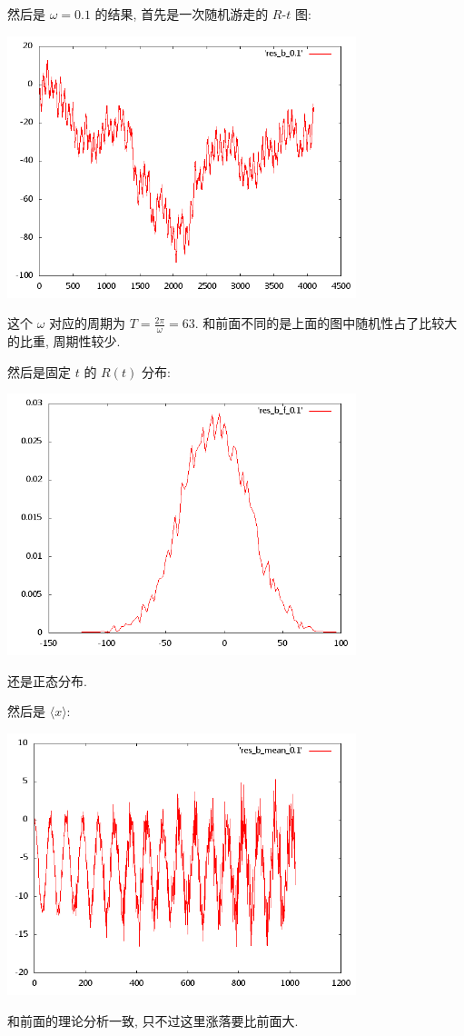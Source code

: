 \documentclass{ctexart}
\begin{document}
然后是 $\omega = 0.1$ 的结果, 首先是一次随机游走的 $R$-$t$ 图:
\begin{center}
\includegraphics[width=4in]{plot_b_0.1.png}
\end{center}
这个 $\omega$ 对应的周期为 $T=\frac{2\pi}{\omega} = 63$.
和前面不同的是上面的图中随机性占了比较大的比重, 周期性较少.

然后是固定 $t$ 的 $R(t)$ 分布:
\begin{center}
\includegraphics[width=4in]{plot_b_f_0.1.png}
\end{center}
还是正态分布.

然后是 $\langle x\rangle$:
\begin{center}
\includegraphics[width=4in]{plot_b_mean_0.1.png}
\end{center}
和前面的理论分析一致, 只不过这里涨落要比前面大.
\end{document}
